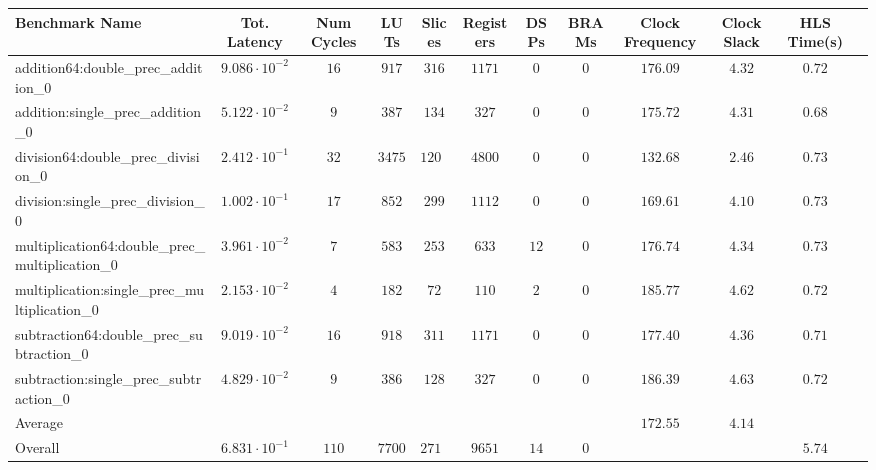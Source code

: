 \begin{tabular}{|l|c|c|c|c|c|c|c|c|c|c|c|}
\hline
Benchmark Name                                   & Tot. Latency            & Num Cycles & LUTs     & Slices   & Registers & DSPs   & BRAMs & Clock Frequency & Clock Slack & HLS Time(s) \\
\hline
addition64:double\_prec\_addition\_0             & $ 9.086 \cdot 10^{-2} $ & $ 16     $ & $ 917  $ & $ 316  $ & $ 1171  $ & $ 0  $ & $ 0 $ & $ 176.09      $ & $ 4.32    $ & $ 0.72    $ \\
addition:single\_prec\_addition\_0               & $ 5.122 \cdot 10^{-2} $ & $ 9      $ & $ 387  $ & $ 134  $ & $ 327   $ & $ 0  $ & $ 0 $ & $ 175.72      $ & $ 4.31    $ & $ 0.68    $ \\
division64:double\_prec\_division\_0             & $ 2.412 \cdot 10^{-1} $ & $ 32     $ & $ 3475 $ & $ 1201 $ & $ 4800  $ & $ 0  $ & $ 0 $ & $ 132.68      $ & $ 2.46    $ & $ 0.73    $ \\
division:single\_prec\_division\_0               & $ 1.002 \cdot 10^{-1} $ & $ 17     $ & $ 852  $ & $ 299  $ & $ 1112  $ & $ 0  $ & $ 0 $ & $ 169.61      $ & $ 4.10    $ & $ 0.73    $ \\
multiplication64:double\_prec\_multiplication\_0 & $ 3.961 \cdot 10^{-2} $ & $ 7      $ & $ 583  $ & $ 253  $ & $ 633   $ & $ 12 $ & $ 0 $ & $ 176.74      $ & $ 4.34    $ & $ 0.73    $ \\
multiplication:single\_prec\_multiplication\_0   & $ 2.153 \cdot 10^{-2} $ & $ 4      $ & $ 182  $ & $ 72   $ & $ 110   $ & $ 2  $ & $ 0 $ & $ 185.77      $ & $ 4.62    $ & $ 0.72    $ \\
subtraction64:double\_prec\_subtraction\_0       & $ 9.019 \cdot 10^{-2} $ & $ 16     $ & $ 918  $ & $ 311  $ & $ 1171  $ & $ 0  $ & $ 0 $ & $ 177.40      $ & $ 4.36    $ & $ 0.71    $ \\
subtraction:single\_prec\_subtraction\_0         & $ 4.829 \cdot 10^{-2} $ & $ 9      $ & $ 386  $ & $ 128  $ & $ 327   $ & $ 0  $ & $ 0 $ & $ 186.39      $ & $ 4.63    $ & $ 0.72    $ \\
\hline
Average                                          & $                     $ & $        $ & $      $ & $      $ & $       $ & $    $ & $   $ & $ 172.55      $ & $ 4.14    $ & $         $ \\
\hline
Overall                                          & $ 6.831 \cdot 10^{-1} $ & $ 110    $ & $ 7700 $ & $ 2714 $ & $ 9651  $ & $ 14 $ & $ 0 $ & $             $ & $         $ & $ 5.74    $ \\
\hline
\end{tabular}
